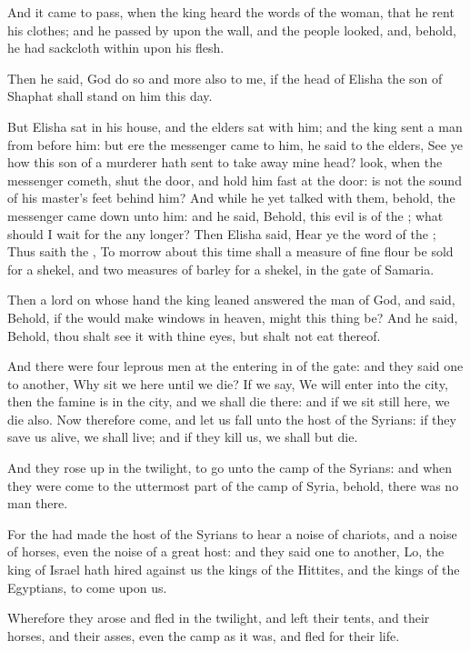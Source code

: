 \Verse And it came to pass, when the king heard the words of the woman, that he rent his clothes; and he passed by upon the wall, and the people looked, and, behold, he had sackcloth within upon his flesh.

\Verse Then he said, God do so and more also to me, if the head of Elisha the son of Shaphat shall stand on him this day.

\Verse But Elisha sat in his house, and the elders sat with him; and the king sent a man from before him: but ere the messenger came to him, he said to the elders, See ye how this son of a murderer hath sent to take away mine head? look, when the messenger cometh, shut the door, and hold him fast at the door: is not the sound of his master's feet behind him?  \Verse And while he yet talked with them, behold, the messenger came down unto him: and he said, Behold, this evil is of the \LORD; what should I wait for the \LORD any longer?  
\Chapter
\Verse Then Elisha said, Hear ye the word of the \LORD; Thus saith the \LORD, To morrow about this time shall a measure of fine flour be sold for a shekel, and two measures of barley for a shekel, in the gate of Samaria.

\Verse Then a lord on whose hand the king leaned answered the man of God, and said, Behold, if the \LORD would make windows in heaven, might this thing be?  And he said, Behold, thou shalt see it with thine eyes, but shalt not eat thereof.

\Verse And there were four leprous men at the entering in of the gate: and they said one to another, Why sit we here until we die?  \Verse If we say, We will enter into the city, then the famine is in the city, and we shall die there: and if we sit still here, we die also. Now therefore come, and let us fall unto the host of the Syrians: if they save us alive, we shall live; and if they kill us, we shall but die.

\Verse And they rose up in the twilight, to go unto the camp of the Syrians: and when they were come to the uttermost part of the camp of Syria, behold, there was no man there.

\Verse For the \LORD had made the host of the Syrians to hear a noise of chariots, and a noise of horses, even the noise of a great host: and they said one to another, Lo, the king of Israel hath hired against us the kings of the Hittites, and the kings of the Egyptians, to come upon us.

\Verse Wherefore they arose and fled in the twilight, and left their tents, and their horses, and their asses, even the camp as it was, and fled for their life.

